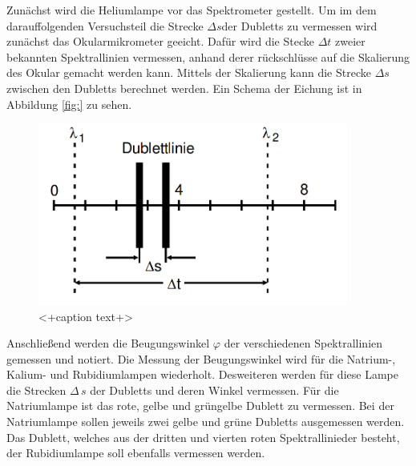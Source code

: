 Zunächst wird die Heliumlampe vor das Spektrometer gestellt. Um im dem darauffolgenden Versuchsteil die Strecke $\Delta s$der Dubletts zu vermessen wird zunächst das Okularmikrometer geeicht. Dafür wird die Stecke $\Delta t$ zweier bekannten Spektrallinien vermessen, anhand derer rückschlüsse auf die Skalierung des Okular gemacht werden kann. Mittels der Skalierung kann die Strecke $\Delta s$ zwischen den Dubletts berechnet werden. Ein Schema der Eichung ist in Abbildung \ref{fig:} zu sehen.
\begin{figure}
  \centering
  \includegraphics[height=6cm]{picture/Duplet.png}
  \caption{<+caption text+>}
  \label{fig:<+label+>}
\end{figure}
Anschließend werden die Beugungswinkel $\varphi$ der verschiedenen Spektrallinien gemessen und notiert. Die Messung der Beugungswinkel wird für die Natrium-, Kalium- und Rubidiumlampen wiederholt. Desweiteren werden für diese Lampe die Strecken $\Delta \, s$ der Dubletts und deren Winkel vermessen. Für die Natriumlampe ist das rote, gelbe und grüngelbe Dublett zu vermessen.  Bei der Natriumlampe sollen jeweils zwei gelbe und grüne Dubletts ausgemessen werden. Das Dublett, welches aus der dritten und vierten roten Spektrallinieder besteht, der Rubidiumlampe soll ebenfalls vermessen werden.

